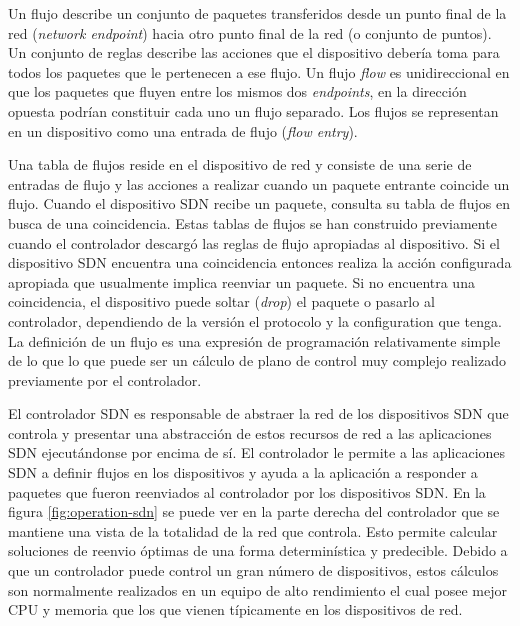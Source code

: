 \documentclass[10pt,journal,compsoc]{IEEEtran}
\begin{document}
Un flujo describe un conjunto de paquetes transferidos desde un punto final de la red (\emph{network endpoint}) hacia otro punto final de la red (o conjunto de puntos). Un conjunto de reglas describe las acciones que el dispositivo debería toma para todos los paquetes que le pertenecen a ese flujo. Un flujo \emph{flow} es unidireccional en que los paquetes que fluyen entre los mismos dos \emph{endpoints}, en la dirección opuesta podrían constituir cada uno un flujo separado. Los flujos se representan en un dispositivo como una entrada de flujo (\emph{flow entry}).

\label{sec:tabla-flujos}
Una tabla de flujos reside en el dispositivo de red y consiste de una serie de entradas de flujo y las acciones a realizar cuando un paquete entrante coincide un flujo. Cuando el dispositivo SDN recibe un paquete, consulta su tabla de flujos en busca de una coincidencia. Estas tablas de flujos se han construido previamente cuando el controlador descargó las reglas de flujo apropiadas al dispositivo. Si el dispositivo SDN encuentra una coincidencia entonces realiza la acción configurada apropiada que usualmente implica reenviar un paquete. Si no encuentra una coincidencia, el dispositivo puede soltar (\emph{drop}) el paquete o pasarlo al controlador, dependiendo de la versión el protocolo y la configuration que tenga. La definición de un flujo es una expresión de programación relativamente simple de lo que lo que puede ser un cálculo de plano de control muy complejo realizado previamente por el controlador.

El controlador SDN es responsable de abstraer la red de los dispositivos SDN que controla y presentar una abstracción de estos recursos de red a las aplicaciones SDN ejecutándonse por encima de sí. El controlador le permite a las aplicaciones SDN a definir flujos en los dispositivos y ayuda a la aplicación a responder a paquetes que fueron reenviados al controlador por los dispositivos SDN. En la figura \ref{fig:operation-sdn} se puede ver en la parte derecha del controlador que se mantiene una vista de la totalidad de la red que controla. Esto permite calcular soluciones de reenvio óptimas de una forma determinística y predecible. Debido a que un controlador puede control un gran número de dispositivos, estos cálculos son normalmente realizados en un equipo de alto rendimiento el cual posee mejor CPU y memoria que los que vienen típicamente en los dispositivos de red.
\end{document}
